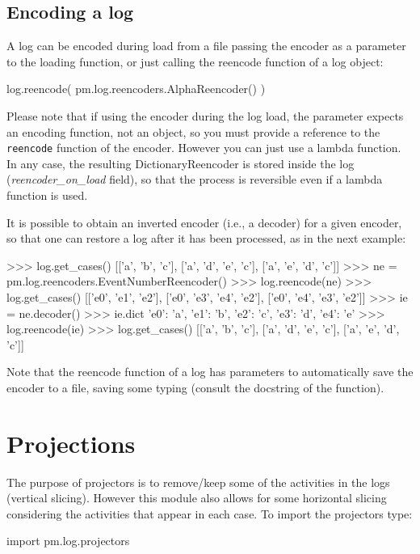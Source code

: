 \documentclass[a4paper,10pt]{book}
\begin{document}
\subsection{Encoding a log}
A log can be encoded during load from a file passing the encoder as a parameter to the loading function, or just calling the reencode function of a log object:\\
\begin{pycode}
log.reencode( pm.log.reencoders.AlphaReencoder() )
\end{pycode}

Please note that if using the encoder during the log load, the parameter expects an encoding function, not an object, so you must provide a reference to the \texttt{reencode} function of the encoder. However you can just use a lambda function. In any case, the resulting DictionaryReencoder is stored inside the log (\emph{reencoder\_on\_load} field), so that the process is reversible even if a lambda function is used.

It is possible to obtain an inverted encoder (i.e., a decoder) for a given encoder, so that one can restore a log after it has been processed, as in the next example:\\
\begin{pycode}
>>> log.get_cases()
[['a', 'b', 'c'], ['a', 'd', 'e', 'c'], ['a', 'e', 'd', 'c']]
>>> ne = pm.log.reencoders.EventNumberReencoder()
>>> log.reencode(ne)
>>> log.get_cases()
[['e0', 'e1', 'e2'], ['e0', 'e3', 'e4', 'e2'], ['e0', 'e4', 'e3', 'e2']]
>>> ie = ne.decoder()
>>> ie.dict
{'e0': 'a', 'e1': 'b', 'e2': 'c', 'e3': 'd', 'e4': 'e'}
>>> log.reencode(ie)
>>> log.get_cases()
[['a', 'b', 'c'], ['a', 'd', 'e', 'c'], ['a', 'e', 'd', 'c']]
\end{pycode}

Note that the reencode function of a log has parameters to automatically save the encoder to a file, saving some typing (consult the docstring of the function).

\section{Projections}
The purpose of projectors is to remove/keep some of the activities in the logs (vertical slicing). However this module also allows for some horizontal slicing considering the activities that appear in each case. To import the projectors type:\\
\begin{pycode}
import pm.log.projectors
\end{pycode}
\end{document}
